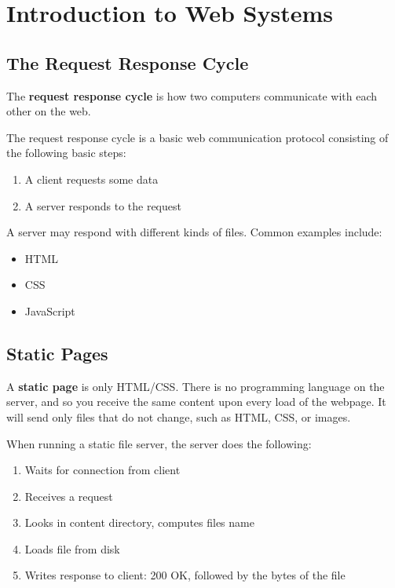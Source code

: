 \chapter{Introduction to Web Systems}
\section{The Request Response Cycle}
The \textbf{request response cycle} is how two computers communicate with each other on the web.

\begin{definition}
	The request response cycle is a basic web communication protocol consisting of the following basic steps:
	\begin{enumerate}
		\item A client requests some data
		\item A server responds to the request
	\end{enumerate}
\end{definition}

A server may respond with different kinds of files. Common examples include:
\begin{itemize}
	\item HTML
	\item CSS
	\item JavaScript
\end{itemize}

\section{Static Pages}
A \textbf{static page} is only HTML/CSS. There is no programming language on the server, and so you receive the same content upon every load of the webpage. It will send only files that do not change, such as HTML, CSS, or images. \par

When running a static file server, the server does the following:
\begin{enumerate}
	\item Waits for connection from client
	\item Receives a request
	\item Looks in content directory, computes files name
	\item Loads file from disk
	\item Writes response to client: 200 OK, followed by the bytes of the file
\end{enumerate}

